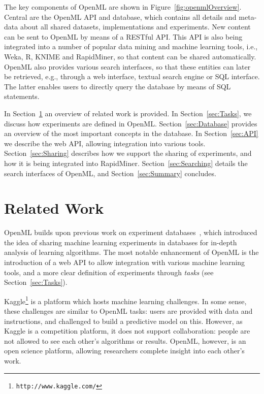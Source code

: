\documentclass[10pt, twoside]{article}
\begin{document}
The key components of OpenML are shown in Figure~\ref{fig:openmlOverview}. Central are the OpenML API and database, which contains all details and meta-data about all shared datasets, implementations and experiments. New content can be sent to OpenML by means of a RESTful API. This API is also being integrated into a number of popular data mining and machine learning tools, i.e., Weka, R, KNIME and RapidMiner, so that content can be shared automatically. OpenML also provides various search interfaces, so that these entities can later be retrieved, e.g., through a web interface, textual search engine or SQL interface. The latter enables users to directly query the database by means of SQL statements. 

In Section~\ref{sec:Related} an overview of related work is provided. In Section~\ref{sec:Tasks}, we discuss how experiments are defined in OpenML. Section~\ref{sec:Database} provides an overview of the most important concepts in the database. In Section~\ref{sec:API} we describe the web API, allowing integration into various tools. Section~\ref{sec:Sharing} describes how we support the sharing of experiments, and how it is being integrated into RapidMiner. Section~\ref{sec:Searching} details the search interfaces of OpenML, and Section~\ref{sec:Summary} concludes. 

\section{Related Work}
\label{sec:Related}
OpenML builds upon previous work on experiment databases~\cite{Vanschoren2012}, which introduced the idea of sharing machine learning experiments in databases for in-depth analysis of learning algorithms. The most notable enhancement of OpenML is the introduction of a web API to allow integration with various machine learning tools, and a more clear definition of experiments through \emph{tasks} (see Section~\ref{sec:Tasks}).

Kaggle\footnote{\texttt{http://www.kaggle.com/}} is a platform which hosts machine learning challenges. In some sense, these challenges are similar to OpenML tasks: users are provided with data and instructions, and challenged to build a predictive model on this. However, as Kaggle is a competition platform, it does not support collaboration: people are not allowed to see each other's algorithms or results. OpenML, however, is an open science platform, allowing researchers complete insight into each other's work. 
\end{document}
